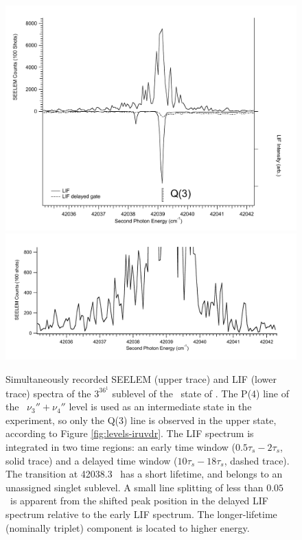 \begin{figure}
  \caption{Simultaneously recorded SEELEM (upper trace) and LIF (lower
    trace) spectra of the $3^36^1$  sublevel of the \astate\
    state of .  The P(4) line of the \xstate\ $\nu_3'' +
    \nu_4''$ level is used as an intermediate state in the experiment,
    so only the Q(3) line is observed in the upper state, according to
    Figure \ref{fig:levels-iruvdr}.  The LIF spectrum is integrated in
    two time regions: an early time window ($0.5\tau_s-2\tau_s$, solid
    trace) and a delayed time window ($10\tau_s-18\tau_s$, dashed
    trace).  The transition at 42038.3 \rcm\ has a short lifetime, and
    belongs to an unassigned singlet sublevel.  A small line splitting
    of less than $0.05$ \rcm\ is apparent from the shifted peak
    position in the delayed LIF spectrum relative to the early LIF
    spectrum.  The longer-lifetime (nominally triplet) component is
    located to higher energy.}
  \label{fig:3361-q3}
  \centering
  \includegraphics[width=6in]{spectrum-3361-q3-split.pdf}
  \includegraphics[width=6in]{spectrum-3361-q3-zoom.pdf}
\end{figure}

